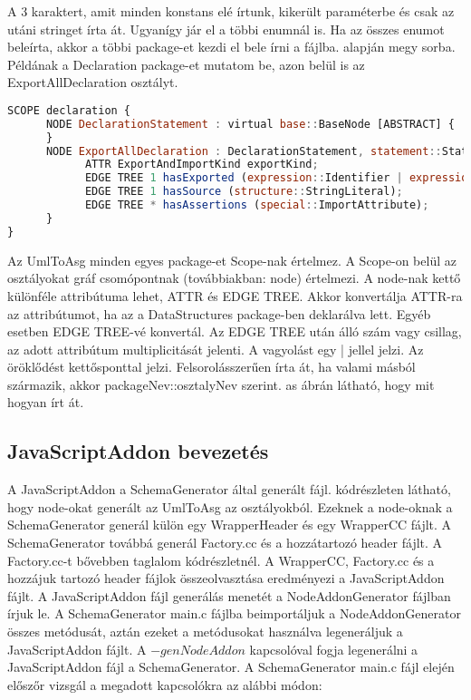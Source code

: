 A 3 karaktert, amit minden konstans elé írtunk, kikerült paraméterbe és csak az utáni stringet írta át.
Ugyanígy jár el a többi enumnál is.
Ha az összes enumot beleírta, akkor a többi package-et kezdi el bele írni a fájlba.  alapján megy sorba.
Példának a Declaration package-et mutatom be, azon belül is az ExportAllDeclaration osztályt.

\begin{lstlisting}[caption={Asg fájl ExportAllDeclaration},label={lst:asg_file_export_all_declaration}, language={JavaScript}]
SCOPE declaration {
      NODE DeclarationStatement : virtual base::BaseNode [ABSTRACT] {
      }
      NODE ExportAllDeclaration : DeclarationStatement, statement::Statement, virtual statement::ProgramStatement, special::Node {
            ATTR ExportAndImportKind exportKind;
            EDGE TREE 1 hasExported (expression::Identifier | expression::LiteralExpression);
            EDGE TREE 1 hasSource (structure::StringLiteral);
            EDGE TREE * hasAssertions (special::ImportAttribute);
      }
}
\end{lstlisting}

Az UmlToAsg minden egyes package-et Scope-nak értelmez.
A Scope-on belül az osztályokat gráf csomópontnak (továbbiakban: node) értelmezi.
A node-nak kettő különféle attribútuma lehet, ATTR és EDGE TREE.
Akkor konvertálja ATTR-ra az attribútumot, ha az a DataStructures package-ben deklarálva lett. Egyéb esetben EDGE TREE-vé konvertál.
Az EDGE TREE után álló szám vagy csillag, az adott attribútum multiplicitását jelenti.
A vagyolást egy | jellel jelzi.
Az öröklődést kettősponttal jelzi.
Felsorolásszerűen írta át, ha valami másból származik, akkor packageNev::osztalyNev szerint.
as ábrán látható, hogy mit hogyan írt át.

\subsection{JavaScriptAddon bevezetés}\label{chap:javaScriptAddon_bevezetes}

\noindent

A JavaScriptAddon a SchemaGenerator által generált fájl.
 kódrészleten látható, hogy node-okat generált az UmlToAsg az osztályokból.
Ezeknek a node-oknak a SchemaGenerator generál külön egy WrapperHeader és egy WrapperCC fájlt.
A SchemaGenerator továbbá generál Factory.cc és a hozzátartozó header fájlt. A Factory.cc-t bővebben taglalom  kódrészletnél.
A WrapperCC, Factory.cc és a hozzájuk tartozó header fájlok összeolvasztása eredményezi a JavaScriptAddon fájlt.
A JavaScriptAddon fájl generálás menetét a NodeAddonGenerator fájlban írjuk le.
A SchemaGenerator main.c fájlba beimportáljuk a NodeAddonGenerator összes metódusát, aztán ezeket a metódusokat használva legeneráljuk a JavaScriptAddon fájlt.
A $-genNodeAddon$ kapcsolóval fogja legenerálni a JavaScriptAddon fájl a SchemaGenerator.
A SchemaGenerator main.c fájl elején előszőr vizsgál a megadott kapcsolókra az alábbi módon:

